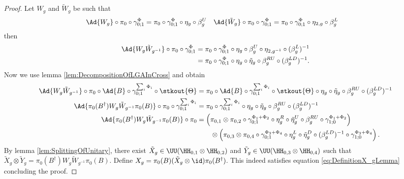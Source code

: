 \begin{proof}
	Let $W_g$ and $\tilde W_g$ be such that
	\begin{align}
		\Ad{W_g}\circ\pi_0\circ\gamma^\Phi_{0;1}& =\pi_0\circ\gamma^\Phi_{0;1}\circ\eta_g\circ\beta_g^U
		&\Ad{\tilde W_g} \circ\pi_0\circ\gamma^\Phi_{0;1}& =\pi_0\circ\gamma^\Phi_{0;1}\circ\eta_{2,g}\circ\beta_g^L
	\end{align}
	then
	\begin{align}
		\Ad{W_g\tilde{W}_{g^{-1}}}\circ\pi_0\circ\gamma^\Phi_{0;1}&=\pi_0\circ\gamma^\Phi_{0;1}\circ\eta_g\circ\beta_g^U\circ\eta_{2,g^{-1}}\circ(\beta_g^L)^{-1}\\
		&=\pi_0\circ\gamma^\Phi_{0;1}\circ\eta_g\circ\tilde{\eta}_g\circ\beta_g^{RU}\circ(\beta_g^{LD})^{-1}.
	\end{align}
	Now we use lemma \ref{lem:DecompositionOfLGAInCross} and obtain
	\begin{align}
		\Ad{W_g\tilde{W}_{g^{-1}}}\circ\pi_0\circ\Ad{B}\circ\gamma^{\sum_i\Phi_i}_{0;1}\circ\stkout{\Theta}&=\pi_0\circ\Ad{B}\circ\gamma^{\sum_i\Phi_i}_{0;1}\circ\stkout{\Theta}\circ\eta_g\circ\tilde{\eta}_g\circ\beta_g^{RU}\circ(\beta_g^{LD})^{-1}\\
		\Ad{\pi_0(B^\dagger)W_g\tilde{W}_{g^{-1}}\pi_0(B)}\circ\pi_0\circ\gamma^{\sum_i\Phi_i}_{0;1}&=\pi_0\circ\gamma^{\sum_i\Phi_i}_{0;1}\circ\eta_g\circ\tilde{\eta}_g\circ\beta_g^{RU}\circ(\beta_g^{LD})^{-1}\\
		\Ad{\pi_0(B^\dagger)W_g\tilde{W}_{g^{-1}}\pi_0(B)}\circ\pi_0&=\left(\pi_{0,1}\otimes\pi_{0,2}\circ\gamma^{\Phi_1+\Phi_2}_{0;1}\circ\eta_g^R\circ\tilde{\eta}_g^U\circ\beta_g^{RU}\circ\gamma^{\Phi_1+\Phi_2}_{1;0}\right)\\
		\nonumber
		&\qquad\otimes \left(\pi_{0,3}\otimes\pi_{0,4}\circ\gamma^{\Phi_3+\Phi_4}_{0;1}\circ\eta_g^L\circ\tilde{\eta}_g^D\circ(\beta_g^{LD})^{-1}\circ\gamma^{\Phi_3+\Phi_4}_{1;0}\right).
	\end{align}
	By lemma \ref{lem:SplittingOfUnitary}, there exist $\tilde{X}_g\in\UU(\HH_{0,1}\otimes\HH_{0,2})$ and $\tilde{Y}_g\in\UU(\HH_{0,3}\otimes\HH_{0,4})$ such that $\tilde{X}_g\otimes\tilde{Y}_g=\pi_0(B^\dagger)W_g\tilde{W}_{g^{-1}}\pi_0(B)$. Define $X_g=\pi_0(B)(\tilde{X}_g\otimes\id)\pi_0(B^\dagger)$. This indeed satisfies equation \eqref{eq:DefinitionX_gLemma} concluding the proof.
\end{proof}
